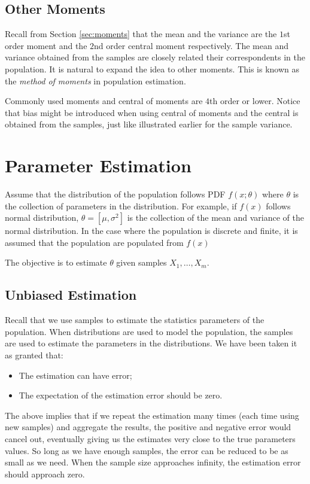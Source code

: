 \subsection{Other Moments}

Recall from Section \ref{sec:moments} that the mean and the variance are the $1$st order moment and the $2$nd order central moment respectively. The mean and variance obtained from the samples are closely related their correspondents in the population. It is natural to expand the idea to other moments. This is known as the \textit{method of moments} in population estimation.

Commonly used moments and central of moments are $4$th order or lower. Notice that bias might be introduced when using central of moments and the central is obtained from the samples, just like illustrated earlier for the sample variance.

\section{Parameter Estimation} \label{sec:mlemap}

Assume that the distribution of the population follows PDF $f(x;\theta)$ where $\theta$ is the collection of parameters in the distribution. For example, if $f(x)$ follows normal distribution, $\theta=[\mu, \sigma^2]$ is the collection of the mean and variance of the normal distribution.  In the case where the population is discrete and finite, it is assumed that the population are populated from $f(x)$

The objective is to estimate $\theta$ given samples $X_1, \ldots, X_m$.

\subsection{Unbiased Estimation}

Recall that we use samples to estimate the statistics parameters of the population. When distributions are used to model the population, the samples are used to estimate the parameters in the distributions. We have been taken it as granted that:
\begin{itemize}
	\item The estimation can have error;
	\item The expectation of the estimation error should be zero.
\end{itemize}
The above implies that if we repeat the estimation many times (each time using new samples) and aggregate the results, the positive and negative error would cancel out, eventually giving us the estimates very close to the true parameters values. So long as we have enough samples, the error can be reduced to be as small as we need. When the sample size approaches infinity, the estimation error should approach zero.

